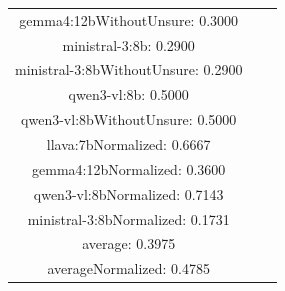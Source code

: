 \documentclass[a4paper]{article}
\begin{document}
\begin{tabular}{ccc}
gemma4:12bWithoutUnsure: 0.3000 \\ ministral-3:8b: 0.2900 \\ ministral-3:8bWithoutUnsure: 0.2900 \\ qwen3-vl:8b: 0.5000 \\ qwen3-vl:8bWithoutUnsure: 0.5000 \\ llava:7bNormalized: 0.6667 \\ gemma4:12bNormalized: 0.3600 \\ qwen3-vl:8bNormalized: 0.7143 \\ ministral-3:8bNormalized: 0.1731 \\ average: 0.3975 \\ averageNormalized: 0.4785 \end{minipage}\\
\end{tabular}

\vspace{5mm}
\end{document}
